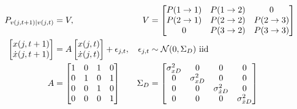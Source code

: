 \documentclass[12pt]{article}
\newcommand{\normal}[2]{{\cal N}(#1,#2)}
\newcommand{\xdot}{{\dot x}}
\newcommand{\ti}[2]{{#1}{(#2)}}                         %
\begin{document}
\begin{subequations}
  \label{eq:dynamics}
  \begin{align}
    P_{\ti{v}{j,t+1}|\ti{v}{j,t}} &= V, & V &=
    \begin{bmatrix}
      P(1 \rightarrow 1) & P(1 \rightarrow 2) & 0 \\
      P(2 \rightarrow 1) & P(2 \rightarrow 2) & P(2 \rightarrow 3) \\
      0 & P(3 \rightarrow 2) & P(3 \rightarrow 3)
    \end{bmatrix} \\
    \begin{bmatrix} \ti{x}{j,t+1} \\ \ti{\xdot}{j,t+1} \end{bmatrix}
    &= A   \begin{bmatrix} \ti{x}{j,t} \\ \ti{\xdot}{j,t} \end{bmatrix}
    + \epsilon_{j,t}, & \epsilon_{j,t} &\sim
    \normal{0}{\Sigma_{D}} \text{ iid} \\
    A &= \begin{bmatrix}
      1 & 0 & 1 & 0 \\
      0 & 1 & 0 & 1 \\
      0 & 0 & 1 & 0 \\
      0 & 0 & 0 & 1
    \end{bmatrix} &
    \Sigma_{D} &= \begin{bmatrix}
      \sigma^2_{xD} & 0 & 0 & 0 \\
      0 & \sigma^2_{xD} & 0 & 0 \\
      0 & 0 & \sigma^2_{\xdot D} & 0 \\
      0 & 0 & 0 & \sigma^2_{\xdot D}
    \end{bmatrix}
  \end{align}
\end{subequations}
\end{document}
